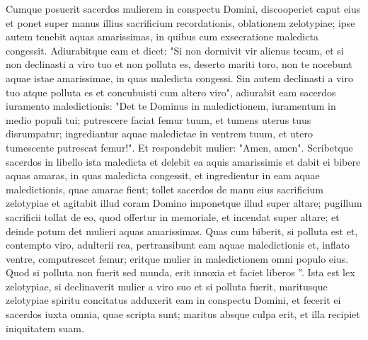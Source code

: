 \begin{biblechapter}
\begin{biblechapter}
\begin{biblechapter}
\begin{biblechapter}
\begin{biblechapter}
\verse Cumque posuerit sacerdos mulierem in conspectu Domini, discooperiet caput eius et ponet super manus illius sacrificium recordationis, oblationem zelotypiae; ipse autem tenebit aquas amarissimas, in quibus cum exsecratione maledicta congessit. 
\verse Adiurabitque eam et dicet: "Si non dormivit vir alienus tecum, et si non declinasti a viro tuo et non polluta es, deserto mariti toro, non te nocebunt aquae istae amarissimae, in quas maledicta congessi. 
 \verse Sin autem declinasti a viro tuo atque polluta es et concubuisti cum altero viro", 
\verse adiurabit eam sacerdos iuramento maledictionis: "Det te Dominus in maledictionem, iuramentum in medio populi tui; putrescere faciat femur tuum, et tumens uterus tuus disrumpatur; 
\verse ingrediantur aquae maledictae in ventrem tuum, et utero tumescente putrescat femur!". Et respondebit mulier: "Amen, amen".
 \verse Scribetque sacerdos in libello ista maledicta et delebit ea aquis amarissimis 
\verse et dabit ei bibere aquas amaras, in quas maledicta congessit, et ingredientur in eam aquae maledictionis, quae amarae fient; 
\verse tollet sacerdos de manu eius sacrificium zelotypiae et agitabit illud coram Domino imponetque illud super altare; 
\verse pugillum sacrificii tollat de eo, quod offertur in memoriale, et incendat super altare; et deinde potum det mulieri aquas amarissimas. 
\verse Quas cum biberit, si polluta est et, contempto viro, adulterii rea, pertransibunt eam aquae maledictionis et, inflato ventre, computrescet femur; eritque mulier in maledictionem omni populo eius. 
\verse Quod si polluta non fuerit sed munda, erit innoxia et faciet liberos ”.
 \verse Ista est lex zelotypiae, si declinaverit mulier a viro suo et si polluta fuerit, 
\verse maritusque zelotypiae spiritu concitatus adduxerit eam in conspectu Domini, et fecerit ei sacerdos iuxta omnia, quae scripta sunt; 
\verse maritus absque culpa erit, et illa recipiet iniquitatem suam.
 

\end{biblechapter}
\end{biblechapter}
\end{biblechapter}
\end{biblechapter}
\end{biblechapter}
